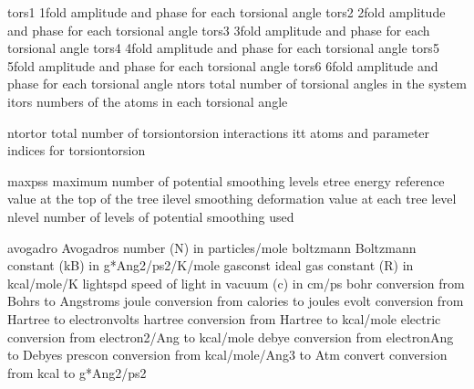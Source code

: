 \documentclass[letterpaper,11pt,english]{sphinxmanual}
\begin{document}
\begin{sphinxVerbatim}[commandchars=\\\{\}]
tors1           1\PYGZhy{}fold amplitude and phase for each torsional angle
tors2           2\PYGZhy{}fold amplitude and phase for each torsional angle
tors3           3\PYGZhy{}fold amplitude and phase for each torsional angle
tors4           4\PYGZhy{}fold amplitude and phase for each torsional angle
tors5           5\PYGZhy{}fold amplitude and phase for each torsional angle
tors6           6\PYGZhy{}fold amplitude and phase for each torsional angle
ntors           total number of torsional angles in the system
itors           numbers of the atoms in each torsional angle
\end{sphinxVerbatim}


\begin{sphinxVerbatim}[commandchars=\\\{\}]
ntortor         total number of torsion\PYGZhy{}torsion interactions
itt             atoms and parameter indices for torsion\PYGZhy{}torsion
\end{sphinxVerbatim}


\begin{sphinxVerbatim}[commandchars=\\\{\}]
maxpss          maximum number of potential smoothing levels
etree           energy reference value at the top of the tree
ilevel          smoothing deformation value at each tree level
nlevel          number of levels of potential smoothing used
\end{sphinxVerbatim}


\begin{sphinxVerbatim}[commandchars=\\\{\}]
avogadro        Avogadro\PYGZsq{}s number (N) in particles/mole
boltzmann       Boltzmann constant (kB) in g*Ang\PYGZca{}2/ps\PYGZca{}2/K/mole
gasconst        ideal gas constant (R) in kcal/mole/K
lightspd        speed of light in vacuum (c) in cm/ps
bohr            conversion from Bohrs to Angstroms
joule           conversion from calories to joules
evolt           conversion from Hartree to electron\PYGZhy{}volts
hartree         conversion from Hartree to kcal/mole
electric        conversion from electron\PYGZca{}2/Ang to kcal/mole
debye           conversion from electron\PYGZhy{}Ang to Debyes
prescon         conversion from kcal/mole/Ang\PYGZca{}3 to Atm
convert         conversion from kcal to g*Ang\PYGZca{}2/ps\PYGZca{}2
\end{sphinxVerbatim}
\end{document}
